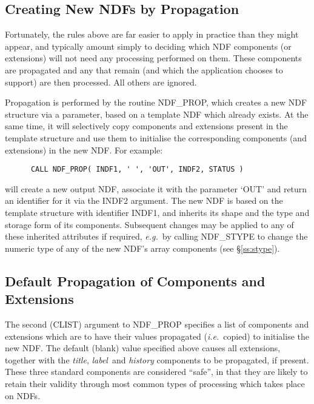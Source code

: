 \documentclass[twoside,11pt]{article}
\newcommand{\htmlref}[2]{#1}
\newcommand{\xlabel}[1]{}
\newcommand{\st}[1]{{\em{#1}}}
\begin{document}
\subsection{\xlabel{creating_new_ndfs_by_propagation}\label{ss:prop}Creating New NDFs by Propagation}

Fortunately, the rules above are far easier to apply in practice than they
might appear, and typically amount simply to deciding which NDF components
(or extensions) will not need any processing performed on them.
These components are propagated and any that remain (and which the
application chooses to support) are then processed. 
All others are ignored.

Propagation is performed by the routine \htmlref{NDF\_PROP}{NDF_PROP}, which creates a new NDF
structure via a parameter, based on a template NDF which already exists. 
At the same time, it will selectively copy components and extensions present
in the template structure and use them to initialise the corresponding
components (and extensions) in the new NDF. 
For example:

\small
\begin{verbatim}
      CALL NDF_PROP( INDF1, ' ', 'OUT', INDF2, STATUS )
\end{verbatim}
\normalsize

will create a new output NDF, associate it with the parameter `OUT' and
return an identifier for it via the INDF2 argument. 
The new NDF is based on the template structure with identifier INDF1, and
inherits its shape and the type and storage form of its components.
Subsequent changes may be applied to any of these inherited attributes if
required, \st{e.g.}\ by calling \htmlref{NDF\_STYPE}{NDF_STYPE} to change the numeric type of any
of the new NDF's array components (see \S\ref{ss:stype}). 

\subsection{\xlabel{default_propagation_of_components_and_extensions}\label{ss:defaultpropagation}Default Propagation of Components and Extensions}

The second (CLIST) argument to \htmlref{NDF\_PROP}{NDF_PROP} specifies a list of
components and extensions which are to have their values propagated
(\st{i.e.}\ copied) to initialise the new NDF.  
The default (blank) value specified above causes all extensions, together
with the \st{title}, \st{label\/}\ and \st{history\/} components to be
propagated, if present. 
These three standard components are considered ``safe'', in that they are
likely to retain their validity through most common types of processing
which takes place on NDFs. 
\end{document}
